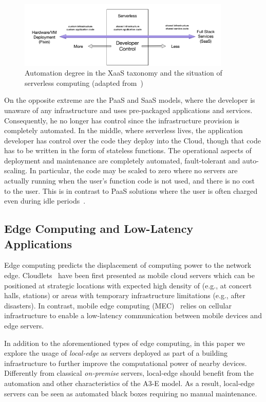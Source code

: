 \begin{figure}[tbp]
	\includegraphics[width=0.9\textwidth]{figs/DeveloperControl.png}
	\caption{Automation degree in the XaaS taxonomy and the situation of serverless computing (adapted from~\cite{baldini2017serverless})}
	\label{fig:developer-control-serverless}
\end{figure}

On the opposite extreme are the PaaS and SaaS models, where the developer is unaware of any infrastructure and uses pre-packaged applications and services. Consequently, he no longer has control since the infrastructure provision is completely automated. In the middle, where serverless lives, the application developer has control over the code they deploy into the Cloud, though that code has to be written in the form of stateless functions.  The operational aspects of deployment and maintenance are completely automated, fault-tolerant and
auto-scaling. In particular, the code may be scaled to zero where no servers are actually running when the user's function code is not used, and there is no cost to the user. This is in contrast to PaaS solutions where the user is often charged even during idle periods~\cite{baldini2017serverless}.





\subsection{Edge Computing and Low-Latency Applications}

Edge computing predicts the displacement of computing power to the network edge. Cloudlets~\cite{CLOUDLETS} have been first presented as mobile cloud servers which can be positioned at strategic locations with expected high density of (e.g., at concert halls, stations) or areas with temporary infrastructure limitations (e.g., after disasters). In contrast, mobile edge computing (MEC)~\cite{MEC} relies on cellular infrastructure to enable a low-latency communication between mobile devices and edge servers. 

In addition to the aforementioned types of edge computing, in this paper we explore the usage of \textit{local-edge} as servers deployed as part of a building infrastructure to further improve the computational power of nearby devices. Differently from classical \textit{on-premise} servers, local-edge should benefit from the automation and other characteristics of the A3-E model. As a result, local-edge servers can be seen as automated black boxes requiring no manual maintenance.
